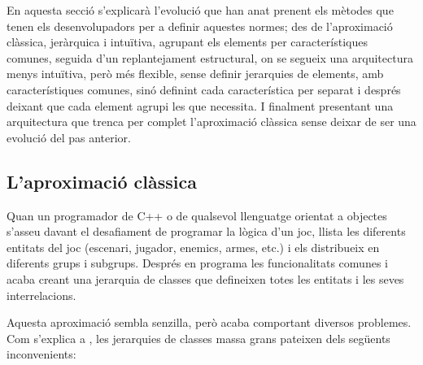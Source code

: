  En aquesta secció s'explicarà l'evolució que han anat prenent els mètodes que tenen els desenvolupadors per a definir aquestes normes; des de l'aproximació clàssica, jeràrquica i intuïtiva, agrupant els elements per característiques comunes, seguida d'un replantejament estructural, on se segueix una arquitectura menys intuïtiva, però més flexible, sense definir jerarquies de elements, amb característiques comunes, sinó definint cada característica per separat i després deixant que cada element agrupi les que necessita. I finalment presentant una arquitectura que trenca per complet l'aproximació clàssica sense deixar de ser una evolució del pas anterior.

\subsection{L'aproximació clàssica}

Quan un programador de {C++} o de qualsevol llenguatge orientat a objectes s'asseu davant el desafiament de programar la lògica d'un joc, llista les diferents entitats del joc (escenari, jugador, enemics, armes, etc.) i els distribueix en diferents grups i subgrups. Després en programa les funcionalitats comunes i acaba creant una jerarquia de classes que defineixen totes les entitats i les seves interrelacions. 

Aquesta aproximació sembla senzilla, però acaba comportant diversos problemes. Com s'explica a \citep[p.~719]{Gregory09}, les jerarquies de classes massa grans pateixen dels següents inconvenients:




